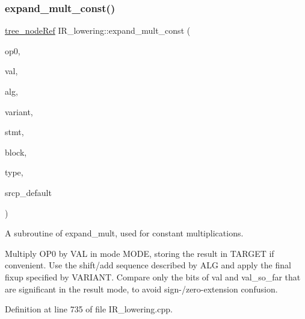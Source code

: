\subsubsection{\texorpdfstring{expand\+\_\+mult\+\_\+const()}{expand\_mult\_const()}}
{\footnotesize\ttfamily \hyperlink{tree__node_8hpp_a6ee377554d1c4871ad66a337eaa67fd5}{tree\+\_\+node\+Ref} I\+R\+\_\+lowering\+::expand\+\_\+mult\+\_\+const (\begin{DoxyParamCaption}\item[{\hyperlink{tree__node_8hpp_a6ee377554d1c4871ad66a337eaa67fd5}{tree\+\_\+node\+Ref}}]{op0,  }\item[{unsigned long long int}]{val,  }\item[{const struct \hyperlink{structalgorithm}{algorithm} \&}]{alg,  }\item[{enum \hyperlink{IR__lowering_8hpp_a77bda416aea7fadb7ca07415dc736441}{mult\+\_\+variant} \&}]{variant,  }\item[{const \hyperlink{tree__node_8hpp_a6ee377554d1c4871ad66a337eaa67fd5}{tree\+\_\+node\+Ref}}]{stmt,  }\item[{const bloc\+Ref}]{block,  }\item[{\hyperlink{tree__node_8hpp_a6ee377554d1c4871ad66a337eaa67fd5}{tree\+\_\+node\+Ref} \&}]{type,  }\item[{const std\+::string \&}]{srcp\+\_\+default }\end{DoxyParamCaption})\hspace{0.3cm}{\ttfamily [private]}}



A subroutine of expand\+\_\+mult, used for constant multiplications. 

Multiply O\+P0 by V\+AL in mode M\+O\+DE, storing the result in T\+A\+R\+G\+ET if convenient. Use the shift/add sequence described by A\+LG and apply the final fixup specified by V\+A\+R\+I\+A\+NT. Compare only the bits of val and val\+\_\+so\+\_\+far that are significant in the result mode, to avoid sign-\//zero-\/extension confusion. 

Definition at line 735 of file I\+R\+\_\+lowering.\+cpp.



